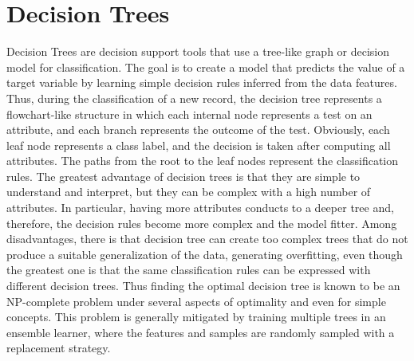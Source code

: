 \section{Decision Trees} \label{DT}
Decision Trees \cite{Quinlan} are decision support tools that use a tree-like graph or decision model for classification. The goal is to create a model that predicts the value of a target variable by learning simple decision rules inferred from the data features. Thus, during the classification of a new record, the decision tree represents a flowchart-like structure in which each internal node represents a test on an attribute, and each branch represents the outcome of the test. Obviously, each leaf node represents a class label, and the decision is taken after computing all attributes. The paths from the root to the leaf nodes represent the classification rules. The greatest advantage of decision trees is that they are simple to understand and interpret, but they can be complex with a high number of attributes. In particular, having more attributes conducts to a deeper tree and, therefore, the decision rules become more complex and the model fitter.
Among disadvantages, there is that decision tree can create too complex trees that do not produce a suitable generalization of the data, generating overfitting, even though the greatest one is that the same classification rules can be expressed with different decision trees. Thus finding the optimal decision tree is known to be an NP-complete problem under several aspects of optimality and even for simple concepts. This problem is generally mitigated by training multiple trees in an ensemble learner, where the features and samples are randomly sampled with a replacement strategy.

